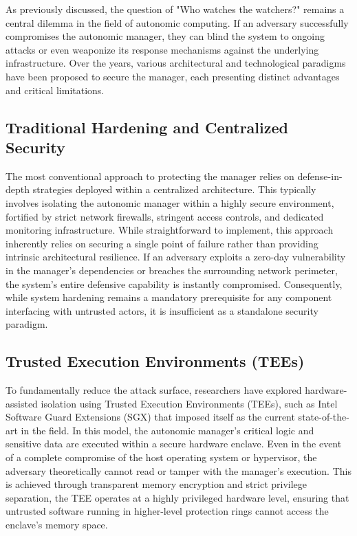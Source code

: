As previously discussed, the question of "Who watches the watchers?" remains a central dilemma in the field of autonomic computing. If an adversary successfully compromises the autonomic manager, they can blind the system to ongoing attacks or even weaponize its response mechanisms against the underlying infrastructure. Over the years, various architectural and technological paradigms have been proposed to secure the manager, each presenting distinct advantages and critical limitations.

\subsection{Traditional Hardening and Centralized Security}
The most conventional approach to protecting the manager relies on defense-in-depth strategies deployed within a centralized architecture. This typically involves isolating the autonomic manager within a highly secure environment, fortified by strict network firewalls, stringent access controls, and dedicated monitoring infrastructure. While straightforward to implement, this approach inherently relies on securing a single point of failure rather than providing intrinsic architectural resilience. If an adversary exploits a zero-day vulnerability in the manager's dependencies or breaches the surrounding network perimeter, the system's entire defensive capability is instantly compromised. Consequently, while system hardening remains a mandatory prerequisite for any component interfacing with untrusted actors, it is insufficient as a standalone security paradigm.

\subsection{Trusted Execution Environments (TEEs)}
To fundamentally reduce the attack surface, researchers have explored hardware-assisted isolation using Trusted Execution Environments (TEEs), such as Intel Software Guard Extensions (SGX) that imposed itself as the current state-of-the-art in the field. In this model, the autonomic manager's critical logic and sensitive data are executed within a secure hardware enclave. Even in the event of a complete compromise of the host operating system or hypervisor, the adversary theoretically cannot read or tamper with the manager's execution. This is achieved through transparent memory encryption and strict privilege separation, the TEE operates at a highly privileged hardware level, ensuring that untrusted software running in higher-level protection rings cannot access the enclave's memory space.

